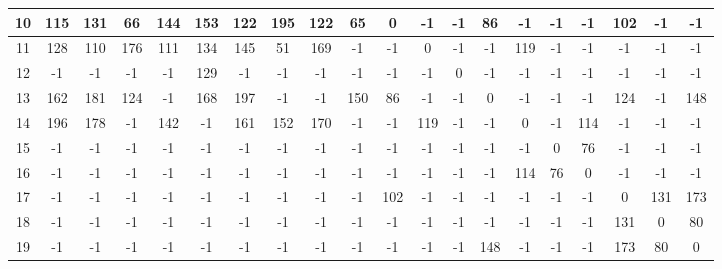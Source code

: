 \documentclass[UTF8,12pt]{ctexart}
\begin{document}
\begin{enumerate}
\begin{itemize}
\begin{table}[H]
{\begin{scriptsize}
\begin{tabular}{cccccccccccccccccccc}
                        \midrule
                        10 & 115    & 131    & 66     & 144    & 153    & 122    & 195    & 122    & 65     & 0      & -1     & -1     & 86     & -1     & -1     & -1     & 102    & -1     & -1  \\
                        \midrule
                        11 & 128    & 110    & 176    & 111    & 134    & 145    & 51     & 169    & -1     & -1     & 0      & -1     & -1     & 119    & -1     & -1     & -1     & -1     & -1  \\
                        \midrule
                        12 & -1     & -1     & -1     & -1     & 129    & -1     & -1     & -1     & -1     & -1     & -1     & 0      & -1     & -1     & -1     & -1     & -1     & -1     & -1  \\
                        \midrule
                        13 & 162    & 181    & 124    & -1     & 168    & 197    & -1     & -1     & 150    & 86     & -1     & -1     & 0      & -1     & -1     & -1     & 124    & -1     & 148  \\
                        \midrule
                        14 & 196    & 178    & -1     & 142    & -1     & 161    & 152    & 170    & -1     & -1     & 119    & -1     & -1     & 0      & -1     & 114    & -1     & -1     & -1  \\
                        \midrule
                        15 & -1     & -1     & -1     & -1     & -1     & -1     & -1     & -1     & -1     & -1     & -1     & -1     & -1     & -1     & 0      & 76     & -1     & -1     & -1  \\
                        \midrule
                        16 & -1     & -1     & -1     & -1     & -1     & -1     & -1     & -1     & -1     & -1     & -1     & -1     & -1     & 114    & 76     & 0      & -1     & -1     & -1  \\
                        \midrule
                        17 & -1     & -1     & -1     & -1     & -1     & -1     & -1     & -1     & -1     & 102    & -1     & -1     & -1     & -1     & -1     & -1     & 0      & 131    & 173  \\
                        \midrule
                        18 & -1     & -1     & -1     & -1     & -1     & -1     & -1     & -1     & -1     & -1     & -1     & -1     & -1     & -1     & -1     & -1     & 131    & 0      & 80  \\
                        \midrule
                        19 & -1     & -1     & -1     & -1     & -1     & -1     & -1     & -1     & -1     & -1     & -1     & -1     & 148    & -1     & -1     & -1     & 173    & 80     & 0   \\
                        \bottomrule
                        \end{tabular}
                        

\end{scriptsize}}
\end{table}
\end{itemize}
\end{enumerate}
\end{document}
